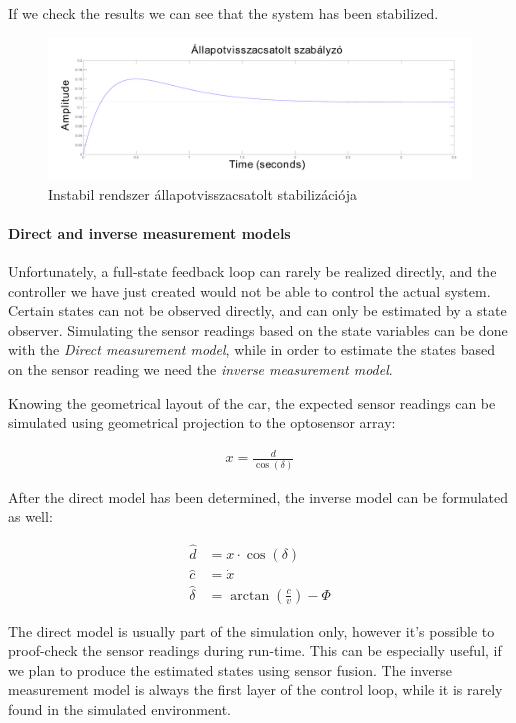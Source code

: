 If we check the results we can see that the system has been stabilized.

\begin{figure}[!ht]
    \centering
    \includegraphics[width=\linewidth]{img/plot2}
    \caption{Instabil rendszer állapotvisszacsatolt stabilizációja}
    \label{fig:plot2}
\end{figure}

\paragraph{Direct and inverse measurement models}

Unfortunately, a full-state feedback loop can rarely be realized directly, and the controller we have just created would not be able to control the actual system. Certain states can not be observed directly, and can only be estimated by a state observer. Simulating the sensor readings based on the state variables can be done with the \emph{Direct measurement model}, while in order to estimate the states based on the sensor reading we need the \emph{inverse measurement model}.

Knowing the geometrical layout of the car, the expected sensor readings can be simulated using geometrical projection to the optosensor array:

\begin{align}
    x = \frac{d}{\cos(\delta)}
\end{align}

After the direct model has been determined, the inverse model can be formulated as well:

\begin{align}
    \hat{d} &= x \cdot \cos(\delta) \\
    \hat{c} &=\dot{x} \\
    \hat{\delta} &= \arctan \left(\frac{c}{v}\right) - \Phi
\end{align}

The direct model is usually part of the simulation only, however it's possible to proof-check the sensor readings during run-time. This can be especially useful, if we plan to produce the estimated states using sensor fusion. The inverse measurement model is always the first layer of the control loop, while it is rarely found in the simulated environment.

